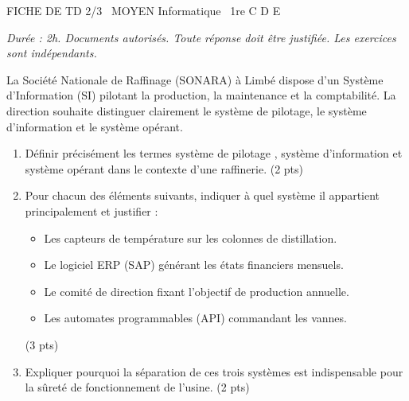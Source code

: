 \documentclass[11pt]{article}
\begin{document}
\begin{tcolorbox}[enhanced,colback=popink,colframe=popink,arc=10pt,boxrule=0pt,left=12pt,right=12pt,top=9pt,bottom=9pt]
{\color{white}\popxbold\small FICHE DE TD 2/3 \textbullet\ MOYEN \hfill Informatique \textbullet\ 1re C D E\par}
\end{tcolorbox}
\vspace{4pt}
\noindent \textit{Durée : 2h. Documents autorisés. Toute réponse doit être justifiée. Les exercices sont indépendants.}

\begin{exercice}
La Société Nationale de Raffinage (SONARA) à Limbé dispose d'un Système d'Information (SI) pilotant la production, la maintenance et la comptabilité. La direction souhaite distinguer clairement le système de pilotage, le système d'information et le système opérant.
\begin{enumerate}
    \item Définir précisément les termes \og système de pilotage \fg, \og système d'information \fg et \og système opérant \fg dans le contexte d'une raffinerie. (2 pts)
    \item Pour chacun des éléments suivants, indiquer à quel système il appartient principalement et justifier : 
    \begin{itemize}
        \item Les capteurs de température sur les colonnes de distillation.
        \item Le logiciel ERP (SAP) générant les états financiers mensuels.
        \item Le comité de direction fixant l'objectif de production annuelle.
        \item Les automates programmables (API) commandant les vannes.
    \end{itemize}
    (3 pts)
    \item Expliquer pourquoi la séparation de ces trois systèmes est indispensable pour la sûreté de fonctionnement de l'usine. (2 pts)
\end{enumerate}
\end{exercice}
\end{document}
